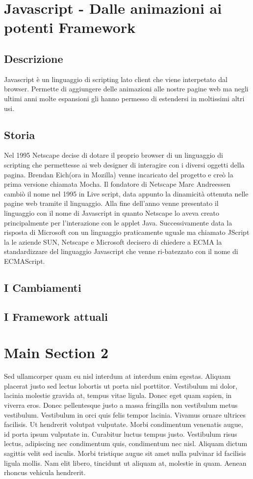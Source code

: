 \section{Javascript - Dalle animazioni ai potenti Framework}
\subsection{Descrizione}
Javascript è un linguaggio di scripting lato client che viene interpetato dal browser. Permette di aggiungere delle animazioni alle nostre pagine web ma negli ultimi anni molte espansioni gli hanno permesso di estendersi in moltissimi altri usi.
\subsection{Storia}
Nel 1995 Netscape decise di dotare il proprio browser di un linguaggio di scripting che permettesse ai web designer di interagire con i diversi oggetti della pagina. Brendan Eich(ora in Mozilla) venne incaricato del progetto e creò la prima versione chiamata Mocha. Il fondatore di Netscape Marc Andreessen cambiò il nome nel 1995 in Live script, data appunto la dinamicità ottenuta nelle pagine web tramite il linguaggio. Alla fine dell'anno venne presentato il linguaggio con il nome di Javascript in quanto Netscape lo aveva creato principalmente per l'interazione con le applet Java.
Successivamente data la risposta di Microsoft con un linguaggio praticamente uguale ma chiamato JScript la le aziende SUN, Netscape e Microsoft decisero di chiedere a ECMA la standardizzare del linguaggio Javascript che venne ri-batezzato con il nome di ECMAScript.
\subsection{I Cambiamenti}
\subsection{I Framework attuali}


\section{Main Section 2}

Sed ullamcorper quam eu nisl interdum at interdum enim egestas. Aliquam placerat justo sed lectus lobortis ut porta nisl porttitor. Vestibulum mi dolor, lacinia molestie gravida at, tempus vitae ligula. Donec eget quam sapien, in viverra eros. Donec pellentesque justo a massa fringilla non vestibulum metus vestibulum. Vestibulum in orci quis felis tempor lacinia. Vivamus ornare ultrices facilisis. Ut hendrerit volutpat vulputate. Morbi condimentum venenatis augue, id porta ipsum vulputate in. Curabitur luctus tempus justo. Vestibulum risus lectus, adipiscing nec condimentum quis, condimentum nec nisl. Aliquam dictum sagittis velit sed iaculis. Morbi tristique augue sit amet nulla pulvinar id facilisis ligula mollis. Nam elit libero, tincidunt ut aliquam at, molestie in quam. Aenean rhoncus vehicula hendrerit.